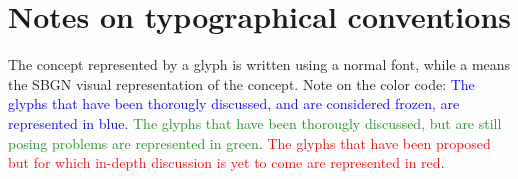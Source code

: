 \section*{Notes on typographical conventions}

The concept represented by a glyph is written using a normal font, while a  means the SBGN visual representation of the concept. Note on the color code: \textcolor{blue}{The glyphs that have been thorougly discussed, and are considered frozen, are represented in blue}. \textcolor{ForestGreen}{The glyphs that have been thorougly discussed, but are still posing problems are represented in green}. \textcolor{red}{The glyphs that have been proposed but for which in-depth discussion is yet to come are represented in red}.



